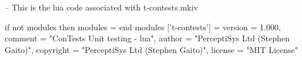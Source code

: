 
\startchapter[title=Preamble]

\startMkIVCode


%
%


\unprotect


\stopMkIVCode

\startLuaCode
-- This is the lua code associated with t-contests.mkiv

if not modules then modules = { } end modules ['t-contests'] = {
    version   = 1.000,
    comment   = "ConTests Unit testing - lua",
    author    = "PerceptiSys Ltd (Stephen Gaito)",
    copyright = "PerceptiSys Ltd (Stephen Gaito)",
    license   = "MIT License"
}

